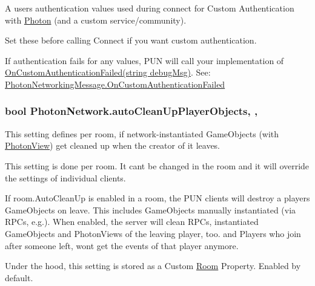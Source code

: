 A user\textquotesingle{}s authentication values used during connect for Custom Authentication with \hyperlink{namespace_photon}{Photon} (and a custom service/community). 

Set these before calling Connect if you want custom authentication. 

If authentication fails for any values, P\+UN will call your implementation of \hyperlink{group__public_api_ggaf30bbea51cc8c4b1ddc239d1c5c1468fa03351bfa4fb9325a5b0486862d4be3be}{On\+Custom\+Authentication\+Failed(string debug\+Msg)}. See\+: \hyperlink{group__public_api_ggaf30bbea51cc8c4b1ddc239d1c5c1468fa03351bfa4fb9325a5b0486862d4be3be}{Photon\+Networking\+Message.\+On\+Custom\+Authentication\+Failed} 
\subsubsection[{\texorpdfstring{auto\+Clean\+Up\+Player\+Objects}{autoCleanUpPlayerObjects}}]{\setlength{\rightskip}{0pt plus 5cm}bool Photon\+Network.\+auto\+Clean\+Up\+Player\+Objects\hspace{0.3cm}{\ttfamily [static]}, {\ttfamily [get]}, {\ttfamily [set]}}\hypertarget{class_photon_network_a6c6fb3cd57d7e2a13d1fc354db0c1fd7}{}\label{class_photon_network_a6c6fb3cd57d7e2a13d1fc354db0c1fd7}


This setting defines per room, if network-\/instantiated Game\+Objects (with \hyperlink{class_photon_view}{Photon\+View}) get cleaned up when the creator of it leaves. 

This setting is done per room. It can\textquotesingle{}t be changed in the room and it will override the settings of individual clients.

If room.\+Auto\+Clean\+Up is enabled in a room, the P\+UN clients will destroy a player\textquotesingle{}s Game\+Objects on leave. This includes Game\+Objects manually instantiated (via R\+P\+Cs, e.\+g.). When enabled, the server will clean R\+P\+Cs, instantiated Game\+Objects and Photon\+Views of the leaving player, too. and Players who join after someone left, won\textquotesingle{}t get the events of that player anymore.

Under the hood, this setting is stored as a Custom \hyperlink{class_room}{Room} Property. Enabled by default. 

